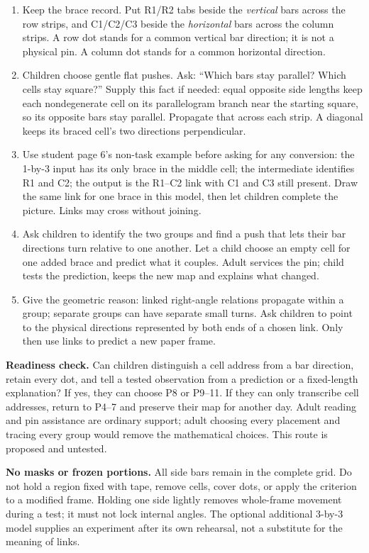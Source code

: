 \documentclass[letterpaper,11pt]{article}
\begin{document}
\begin{enumerate}
\item Keep the brace record. Put R1/R2 tabs beside the \emph{vertical} bars across the row strips, and C1/C2/C3 beside the \emph{horizontal} bars across the column strips. A row dot stands for a common vertical bar direction; it is not a physical pin. A column dot stands for a common horizontal direction.
\item Children choose gentle flat pushes. Ask: ``Which bars stay parallel? Which cells stay square?'' Supply this fact if needed: equal opposite side lengths keep each nondegenerate cell on its parallelogram branch near the starting square, so its opposite bars stay parallel. Propagate that across each strip. A diagonal keeps its braced cell's two directions perpendicular.
\item Use student page 6's non-task example before asking for any conversion: the 1-by-3 input has its only brace in the middle cell; the intermediate identifies R1 and C2; the output is the R1--C2 link with C1 and C3 still present. Draw the same link for one brace in this model, then let children complete the picture. Links may cross without joining.
\item Ask children to identify the two groups and find a push that lets their bar directions turn relative to one another. Let a child choose an empty cell for one added brace and predict what it couples. Adult services the pin; child tests the prediction, keeps the new map and explains what changed.
\item Give the geometric reason: linked right-angle relations propagate within a group; separate groups can have separate small turns. Ask children to point to the physical directions represented by both ends of a chosen link. Only then use links to predict a new paper frame.
\end{enumerate}

\textbf{Readiness check.} Can children distinguish a cell address from a bar direction, retain every dot, and tell a tested observation from a prediction or a fixed-length explanation? If yes, they can choose P8 or P9--11. If they can only transcribe cell addresses, return to P4--7 and preserve their map for another day. Adult reading and pin assistance are ordinary support; adult choosing every placement and tracing every group would remove the mathematical choices. This route is proposed and untested.

\textbf{No masks or frozen portions.} All side bars remain in the complete grid. Do not hold a region fixed with tape, remove cells, cover dots, or apply the criterion to a modified frame. Holding one side lightly removes whole-frame movement during a test; it must not lock internal angles. The optional additional 3-by-3 model supplies an experiment after its own rehearsal, not a substitute for the meaning of links.
\end{document}
